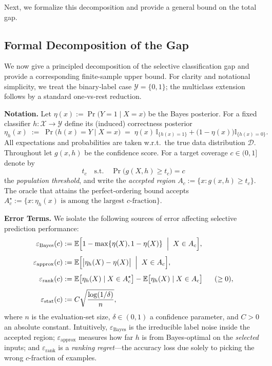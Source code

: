 Next, we formalize this decomposition and provide a general bound on the total gap.

\subsection{Formal Decomposition of the Gap}
\label{sec:formal-gap}

We now give a principled decomposition of the selective classification gap and provide a corresponding finite-sample upper bound. For clarity and notational simplicity, we treat the binary‑label case \(\mathcal{Y}=\{0,1\}\); the multiclass extension follows by a standard one‑vs‑rest reduction.

\textbf{Notation.} Let \(\eta(x):=\Pr\bigl(Y=1\mid X=x\bigr)\) be the Bayes posterior.
For a fixed classifier \(h:\mathcal{X}\to\mathcal{Y}\) define its
(induced) correctness posterior
\begin{equation}
  \eta_h(x)\;:=\;\Pr\bigl(h(x)=Y\mid X=x\bigr)
  \;=\;\eta(x)\,\mathbb{I}_{\{h(x)=1\}}+
        \bigl(1-\eta(x)\bigr)\mathbb{I}_{\{h(x)=0\}}.
\end{equation}
All expectations and probabilities are taken w.r.t.\ the true data distribution
\(\mathcal{D}\). Throughout let \(g(x,h)\) be the confidence score.
For a target coverage \(c\in(0,1]\) denote by
\begin{equation}
  t_c \quad \text{s.t.}\quad
  \Pr\bigl(g(X,h)\ge t_c\bigr)=c
\end{equation}
the \emph{population threshold}, and write the
\emph{accepted region}
\(A_c:=\{x:g(x,h)\ge t_c\}\).  
The oracle that attains the perfect‑ordering bound accepts $A_c^{\star}:=\bigl\{x:\eta_h(x)\text{ is among the largest }c\text{-fraction}\bigr\}$.

\textbf{Error Terms.} We isolate the following sources of error affecting selective prediction performance:
\begin{align}
\varepsilon_{\text{Bayes}}(c)
&:=\mathbb{E}\Bigl[1-\max\{\eta(X),1-\eta(X)\}\;\Bigm|\;X\in A_c\Bigr],
\\[4pt]
\varepsilon_{\text{approx}}(c)
&:=\mathbb{E}\Bigl[\bigl|\eta_h(X)-\eta(X)\bigr|\;\Bigm|\;X\in A_c\Bigr],
\\[4pt]
\varepsilon_{\text{rank}}(c)
&:=\mathbb{E}\bigl[\eta_h(X)\mid X\in A_c^{\star}\bigr]
  -\mathbb{E}\bigl[\eta_h(X)\mid X\in A_c\bigr]\;\;\;\;\;\;(\ge0),
\\[4pt]
\varepsilon_{\text{stat}}(c)
&:=C\sqrt{\frac{\log(1/\delta)}{n}},
\end{align}
where \(n\) is the evaluation‑set size, \(\delta\in(0,1)\) a confidence
parameter, and \(C>0\) an absolute constant. Intuitively, \(\varepsilon_{\text{Bayes}}\) is the irreducible label noise inside the accepted region; \(\varepsilon_{\text{approx}}\) measures how far \(h\) is from Bayes‑optimal on the \emph{selected} inputs; and \(\varepsilon_{\text{rank}}\) is a \emph{ranking regret}—the accuracy loss due solely to picking the wrong \(c\)-fraction of examples.

